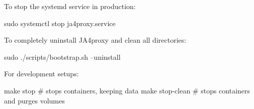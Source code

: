 To stop the systemd service in production:
\begin{bashcode}
sudo systemctl stop ja4proxy.service
\end{bashcode}

To completely uninstall JA4proxy and clean all directories:
\begin{bashcode}
sudo ./scripts/bootstrap.sh --uninstall
\end{bashcode}

For development setups:
\begin{bashcode}
make stop             # stops containers, keeping data
make stop-clean       # stops containers and purges volumes
\end{bashcode}
